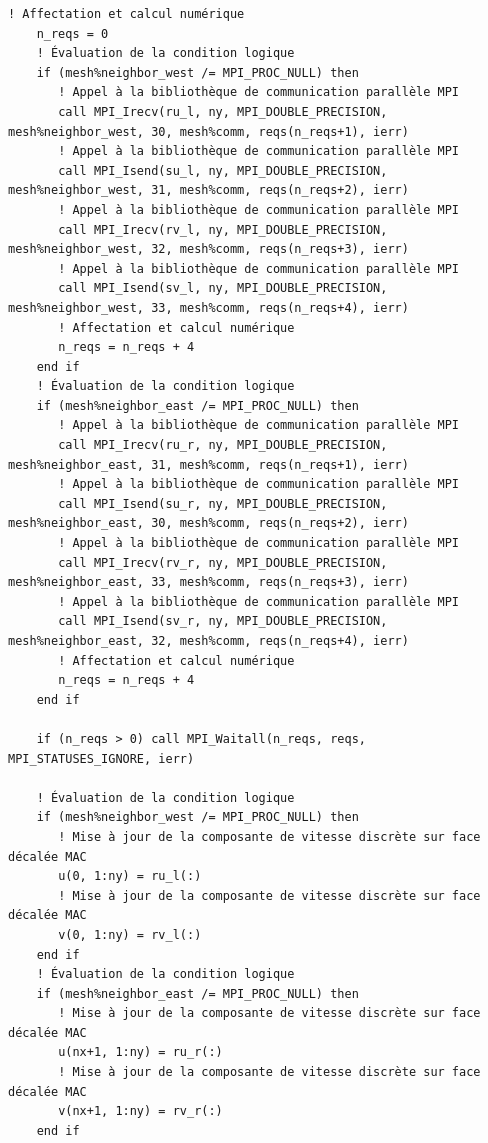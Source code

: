 \documentclass[10pt,a4paper,oneside]{book}
\begin{document}
\begin{lstlisting}[language={[95]Fortran}]
    ! Affectation et calcul numérique
    n_reqs = 0
    ! Évaluation de la condition logique
    if (mesh%neighbor_west /= MPI_PROC_NULL) then
       ! Appel à la bibliothèque de communication parallèle MPI
       call MPI_Irecv(ru_l, ny, MPI_DOUBLE_PRECISION, mesh%neighbor_west, 30, mesh%comm, reqs(n_reqs+1), ierr)
       ! Appel à la bibliothèque de communication parallèle MPI
       call MPI_Isend(su_l, ny, MPI_DOUBLE_PRECISION, mesh%neighbor_west, 31, mesh%comm, reqs(n_reqs+2), ierr)
       ! Appel à la bibliothèque de communication parallèle MPI
       call MPI_Irecv(rv_l, ny, MPI_DOUBLE_PRECISION, mesh%neighbor_west, 32, mesh%comm, reqs(n_reqs+3), ierr)
       ! Appel à la bibliothèque de communication parallèle MPI
       call MPI_Isend(sv_l, ny, MPI_DOUBLE_PRECISION, mesh%neighbor_west, 33, mesh%comm, reqs(n_reqs+4), ierr)
       ! Affectation et calcul numérique
       n_reqs = n_reqs + 4
    end if
    ! Évaluation de la condition logique
    if (mesh%neighbor_east /= MPI_PROC_NULL) then
       ! Appel à la bibliothèque de communication parallèle MPI
       call MPI_Irecv(ru_r, ny, MPI_DOUBLE_PRECISION, mesh%neighbor_east, 31, mesh%comm, reqs(n_reqs+1), ierr)
       ! Appel à la bibliothèque de communication parallèle MPI
       call MPI_Isend(su_r, ny, MPI_DOUBLE_PRECISION, mesh%neighbor_east, 30, mesh%comm, reqs(n_reqs+2), ierr)
       ! Appel à la bibliothèque de communication parallèle MPI
       call MPI_Irecv(rv_r, ny, MPI_DOUBLE_PRECISION, mesh%neighbor_east, 33, mesh%comm, reqs(n_reqs+3), ierr)
       ! Appel à la bibliothèque de communication parallèle MPI
       call MPI_Isend(sv_r, ny, MPI_DOUBLE_PRECISION, mesh%neighbor_east, 32, mesh%comm, reqs(n_reqs+4), ierr)
       ! Affectation et calcul numérique
       n_reqs = n_reqs + 4
    end if

    if (n_reqs > 0) call MPI_Waitall(n_reqs, reqs, MPI_STATUSES_IGNORE, ierr)

    ! Évaluation de la condition logique
    if (mesh%neighbor_west /= MPI_PROC_NULL) then
       ! Mise à jour de la composante de vitesse discrète sur face décalée MAC
       u(0, 1:ny) = ru_l(:)
       ! Mise à jour de la composante de vitesse discrète sur face décalée MAC
       v(0, 1:ny) = rv_l(:)
    end if
    ! Évaluation de la condition logique
    if (mesh%neighbor_east /= MPI_PROC_NULL) then
       ! Mise à jour de la composante de vitesse discrète sur face décalée MAC
       u(nx+1, 1:ny) = ru_r(:)
       ! Mise à jour de la composante de vitesse discrète sur face décalée MAC
       v(nx+1, 1:ny) = rv_r(:)
    end if


\end{lstlisting}
\end{document}
